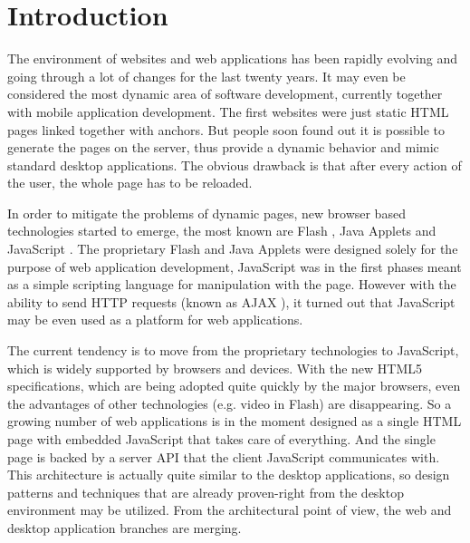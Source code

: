 \documentclass[12pt,a4paper]{report}
\begin{document}
\newpage
\pagestyle{plain}
\setcounter{page}{1}
\tableofcontents



\chapter{Introduction}

The environment of websites and web applications has been rapidly evolving and going through a lot of changes for the last twenty years. It may even be considered the most dynamic area of software development, currently together with mobile application development. The first websites were just static HTML pages linked together with anchors. But people soon found out it is possible to generate the pages on the server, thus provide a dynamic behavior and mimic standard desktop applications. The obvious drawback is that after every action of the user, the whole page has to be reloaded. 

In order to mitigate the problems of dynamic pages, new browser based technologies started to emerge, the most known are Flash \cite{Flash}, Java Applets \cite{JavaApplets} and JavaScript \cite{JavaScript} \cite{EcmaScript}. The proprietary Flash and Java Applets were designed solely for the purpose of web application development, JavaScript was in the first phases meant as a simple scripting language for manipulation with the page. However with the ability to send HTTP requests (known as AJAX \cite{Ajax}), it turned out that JavaScript may be even used as a platform for web applications. 

The current tendency is to move from the proprietary technologies to JavaScript, which is widely supported by browsers and devices. With the new HTML5 \cite{Html5} specifications, which are being adopted quite quickly by the major browsers, even the advantages of other technologies (e.g. video in Flash) are disappearing. So a growing number of web applications is in the moment designed as a single HTML page with embedded JavaScript that takes care of everything. And the single page is backed by a server API that the client JavaScript communicates with. This architecture is actually quite similar to the desktop applications, so design patterns and techniques that are already proven-right from the desktop environment may be utilized. From the architectural point of view, the web and desktop application branches are merging.
\end{document}
